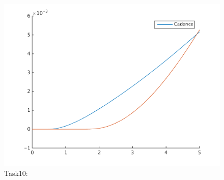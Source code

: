 \documentclass[11pt,a4paper]{report}
\begin{document}
\begin{figure}[ht!]
\caption{Task10: }
\centering
\includegraphics[scale=1]{task10.png}
\end{figure}
\end{document}
